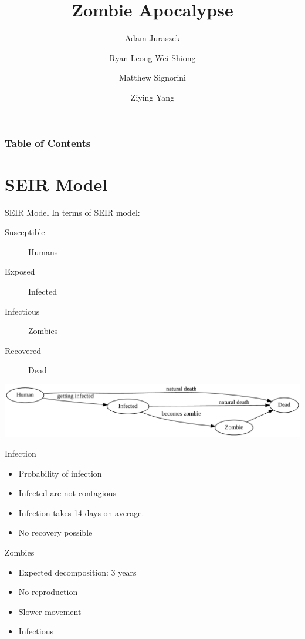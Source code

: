 \documentclass{beamer}
\title{Zombie Apocalypse}
\author{Adam Juraszek \and Ryan Leong Wei Shiong \and Matthew Signorini \and Ziying Yang}
\institute{The University of Melbourne}
\begin{document}
\begin{frame}
    \titlepage
\end{frame}

\begin{frame}
    \frametitle{Table of Contents}
    \tableofcontents
\end{frame}

\section{SEIR Model}

\begin{frame}{SEIR Model}
    In terms of SEIR model:
    \begin{description}
        \item[Susceptible] Humans
        \item[Exposed] Infected
        \item[Infectious] Zombies
        \item[Recovered] Dead
    \end{description}

    \includegraphics[width=\textwidth]{model}
\end{frame}

\begin{frame}{Infection}
    \begin{itemize}
        \item Probability of infection
        \item Infected are not contagious
        \item Infection takes 14 days on average.
        \item No recovery possible
    \end{itemize}
\end{frame} 

\begin{frame}{Zombies}
    \begin{itemize}
        \item Expected decomposition: 3 years
        \item No reproduction
        \item Slower movement
        \item Infectious
    \end{itemize}
\end{frame}
\end{document}
